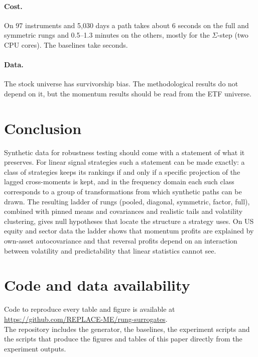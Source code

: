 \documentclass[11pt]{article}
\theoremstyle{definition}
\theoremstyle{remark}
\begin{document}
\paragraph{Cost.} On 97 instruments and 5{,}030 days a path takes about 6 seconds on the full and symmetric rungs and 0.5--1.3 minutes on the others, mostly for the
$\Sigma$-step (two CPU cores). The baselines take seconds.

\paragraph{Data.} The stock universe has survivorship bias. The methodological results do not depend on it, but the momentum results should be read from the ETF universe.

\section{Conclusion}

Synthetic data for robustness testing should come with a statement of what it preserves. For linear signal strategies such a statement can be made exactly: a class of
strategies keeps its rankings if and only if a specific projection of the lagged cross-moments is kept, and in the frequency domain each such class corresponds to a group of
transformations from which synthetic paths can be drawn. The resulting ladder of rungs (pooled, diagonal, symmetric, factor, full), combined with pinned means and covariances
and realistic tails and volatility clustering, gives null hypotheses that locate the structure a strategy uses. On US equity and sector data the ladder shows that momentum
profits are explained by own-asset autocovariance and that reversal profits depend on an interaction between volatility and predictability that linear statistics cannot see.

\section*{Code and data availability}
Code to reproduce every table and figure is available at\\ \url{https://github.com/REPLACE-ME/rung-surrogates}.\\ The repository includes the generator, the baselines, the
experiment scripts and the scripts that produce the figures and tables of this paper directly from the experiment outputs.
\end{document}
